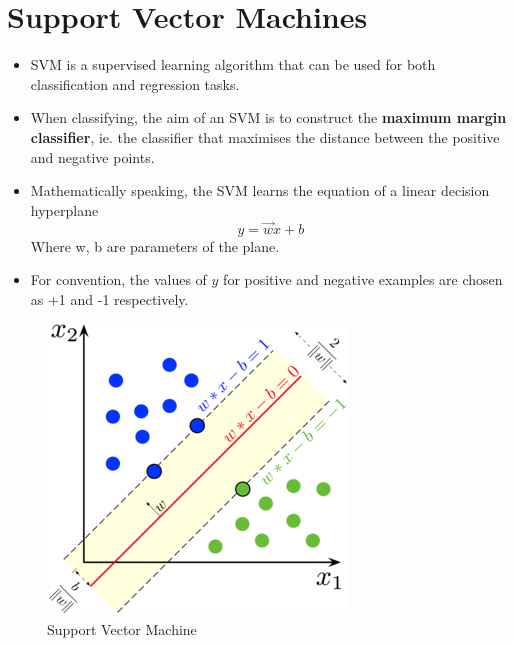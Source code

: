 \documentclass{article}
\theoremstyle{plain}
\theoremstyle{definition}
\begin{document}
\section{Support Vector Machines}
\begin{itemize}
    \item SVM is a supervised learning algorithm that can be used for both classification and regression tasks. 
    
    \item When classifying, the aim of an SVM is to construct the \textbf{maximum margin classifier}, ie. the classifier that maximises the distance between the positive and negative points. 
    
    \item Mathematically speaking, the SVM learns the equation of a linear decision hyperplane 
    \begin{equation*}
        y = \overrightarrow{w}x + b
    \end{equation*}
    Where w, b are parameters of the plane. 
    
    \item For convention, the values of $y$ for positive and negative examples are chosen as +1 and -1 respectively. 
    
\end{itemize}
\begin{figure}[!h]
    \centering
    \includegraphics[scale=2]{svm.png}
    \caption{Support Vector Machine}
    \label{fig:my_label_1}
\end{figure}
\end{document}
